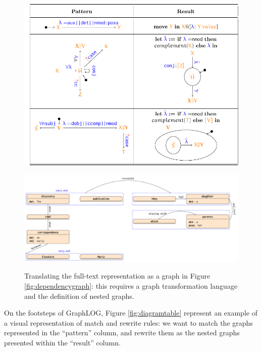 \begin{figure}[!pth]
	\begin{minipage}[b]{\textwidth}
		\centering
		\includegraphics[width=\textwidth]{fig/05language/diagramtable}
		\label{fig:diagramtable}
	\end{minipage}
	\begin{minipage}[b]{\textwidth}
		\centering
		\includegraphics[width=1.2\textwidth]{fig/05language/nestedrepr}
		\label{fig:nestedrepr}
	\end{minipage}
	\caption{Translating the full-text representation as a graph in Figure \ref{fig:dependencygraph}: this requires a graph transformation language and the definition of nested graphs.}
	\label{fig:globalconversiontext}
\end{figure}
	On the footsteps of GraphLOG, Figure \ref{fig:diagramtable} represent an example of a visual representation of match and rewrite rules: we want to match the graphs represented in the ``pattern'' column, and rewrite them as the nested graphs presented within the ``result'' column. 

